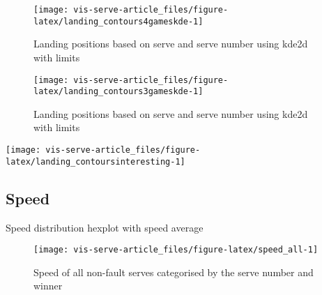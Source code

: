 \documentclass[article]{jss}
\begin{document}
\begin{CodeChunk}
\begin{figure}

{\centering \texttt{[image: vis-serve-article\_files/figure-latex/landing\_contours4gameskde-1]} 

}

\caption[Landing positions based on serve and serve number using kde2d with limits]{Landing positions based on serve and serve number using kde2d with limits}\label{fig:landing_contours4gameskde}
\end{figure}
\end{CodeChunk}

\begin{CodeChunk}
\begin{figure}

{\centering \texttt{[image: vis-serve-article\_files/figure-latex/landing\_contours3gameskde-1]} 

}

\caption[Landing positions based on serve and serve number using kde2d with limits]{Landing positions based on serve and serve number using kde2d with limits}\label{fig:landing_contours3gameskde}
\end{figure}
\end{CodeChunk}

\begin{CodeChunk}


\begin{center}\texttt{[image: vis-serve-article\_files/figure-latex/landing\_contoursinteresting-1]} \end{center}

\end{CodeChunk}

\subsection{Speed}\label{speed}

Speed distribution hexplot with speed average

\begin{CodeChunk}
\begin{figure}

{\centering \texttt{[image: vis-serve-article\_files/figure-latex/speed\_all-1]} 

}

\caption[Speed of all non-fault serves categorised by the serve number and winner]{Speed of all non-fault serves categorised by the serve number and winner}\label{fig:speed_all}
\end{figure}
\end{CodeChunk}
\end{document}
